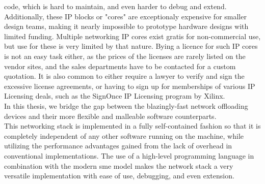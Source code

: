 code, which is hard to maintain, and even harder to debug and
extend\cite{opencores_mission}.  Additionally, these IP blocks or
"cores" are exceptionaly expensive for smaller design teams, making
it nearly impossible to prototype hardware designs with limited
funding\cite{opencores_mission}. Multiple networking IP cores exist gratis for
non-commercial use, but use for these is very limited by that nature.
Bying a licence for such IP cores is not an easy task either, as the
prices of the licenses are rarely listed on the vendor sites, and the
sales departments have to be contacted for a custom quotation. It is
also common to either require a lawyer to verify and sign the excessive
license agreements, or having to sign up for memberships of various
IP Licensing deals, such as the SignOnce IP Licensing program by
Xilinx\cite{xilinx_signonce}.\\

In this thesis, we bridge the gap between the blazingly-fast network offloading
devices and their more flexible and malleable software counterparts.\\
This networking stack is implemented in a fully self-contained fashion so that
it is completely independent of any other software running on the machine, while
utilizing the performance advantages gained from the lack of overhead in
conventional implementations.
The use of a high-level programming language in combination with the modern
\gls{sme} model makes the network stack a very versatile
implementation with ease of use, debugging, and even extension.


